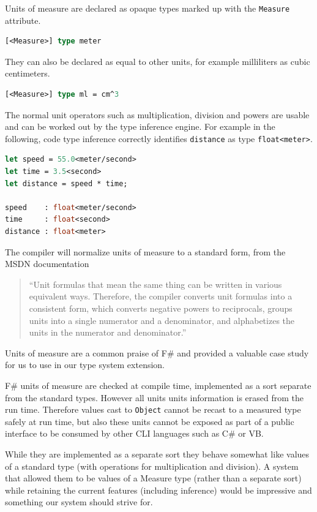 \documentclass[english]{report}
\begin{document}
Units of measure are declared as opaque types marked up with the \texttt{Measure}
attribute.
\begin{lstlisting}[keywordstyle={\color{blue}},language=ML]
[<Measure>] type meter
\end{lstlisting}
They can also be declared as equal to other units, for example milliliters
as cubic centimeters.
\begin{lstlisting}[keywordstyle={\color{blue}},language=ML]
[<Measure>] type ml = cm^3
\end{lstlisting}
The normal unit operators such as multiplication, division and powers
are usable and can be worked out by the type inference engine. For
example in the following, code type inference correctly identifies
\texttt{distance} as type \texttt{float<meter>}.
\begin{lstlisting}[keywordstyle={\color{blue}},language=ML]
let speed = 55.0<meter/second>
let time = 3.5<second>
let distance = speed * time;

speed    : float<meter/second>
time     : float<second>
distance : float<meter>
\end{lstlisting}
The compiler will normalize units of measure to a standard form, from
the MSDN documentation\cite{fsharp-units-of-measure}
\begin{quotation}
``Unit formulas that mean the same thing can be written in various
equivalent ways. Therefore, the compiler converts unit formulas into
a consistent form, which converts negative powers to reciprocals,
groups units into a single numerator and a denominator, and alphabetizes
the units in the numerator and denominator.''
\end{quotation}
Units of measure are a common praise of F\# and provided a valuable
case study for us to use in our type system extension. 

F\# units of measure are checked at compile time, implemented as a
sort separate from the standard types. However all units units information
is erased from the run time. Therefore values cast to \texttt{Object}
cannot be recast to a measured type safely at run time, but also these
units cannot be exposed as part of a public interface to be consumed
by other CLI languages such as C\# or VB. 

While they are implemented as a separate sort they behave somewhat
like values of a standard type (with operations for multiplication
and division). A system that allowed them to be values of a Measure
type (rather than a separate sort) while retaining the current features
(including inference) would be impressive and something our system
should strive for.
\end{document}
